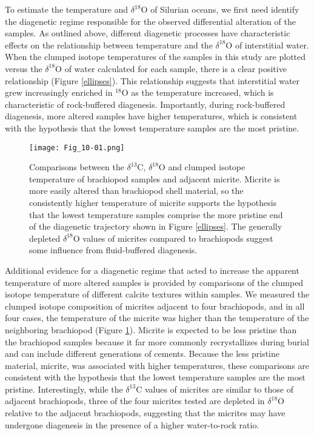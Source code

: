\documentclass[5p, authoryear]{elsarticle}
\begin{document}
To estimate the temperature and $\delta^{18}$O of Silurian oceans, we first need identify the diagenetic regime responsible for the observed differential alteration of the samples. As outlined above, different diagenetic processes have characteristic effects on the relationship between temperature and the $\delta^{18}$O of interstitial water. When the clumped isotope temperatures of the samples in this study are plotted versus the $\delta^{18}$O of water calculated for each sample, there is a clear positive relationship (Figure \ref{ellipses}). This relationship suggests that interstitial water grew increasingly enriched in $^{18}$O as the temperature increased, which is characteristic of rock-buffered diagenesis. Importantly, during rock-buffered diagenesis, more altered samples have higher temperatures, which is consistent with the hypothesis that the lowest temperature samples are the most pristine.

\begin{figure}[t]
\centering
\texttt{[image: Fig\_10-01.png]}
\caption{Comparisons between the $\delta^{13}$C, $\delta^{18}$O and clumped isotope temperature of brachiopod samples and adjacent micrite. Micrite is more easily altered than brachiopod shell material, so the consistently higher temperature of micrite supports the hypothesis that the lowest temperature samples comprise the more pristine end of the diagenetic trajectory shown in Figure \ref{ellipses}. The generally depleted $\delta^{18}$O values of micrites compared to brachiopods suggest some influence from fluid-buffered diagenesis.}
\label{comparisons}
\end{figure}

Additional evidence for a diagenetic regime that acted to increase the apparent temperature of more altered samples is provided by comparisons of the clumped isotope temperature of different calcite textures within samples. We measured the clumped isotope composition of micrites adjacent to four brachiopods, and in all four cases, the temperature of the micrite was higher than the temperature of the neighboring brachiopod (Figure \ref{comparisons}). Micrite is expected to be less pristine than the brachiopod samples because it far more commonly recrystallizes during burial and can include different generations of cements. Because the less pristine material, micrite, was associated with higher temperatures, these comparisons are consistent with the hypothesis that the lowest temperature samples are the most pristine. Interestingly, while the $\delta^{13}$C values of micrites are similar to those of adjacent brachiopods, three of the four micrites tested are depleted in $\delta^{18}$O relative to the adjacent brachiopods, suggesting that the micrites may have undergone diagenesis in the presence of a higher water-to-rock ratio.
\end{document}
